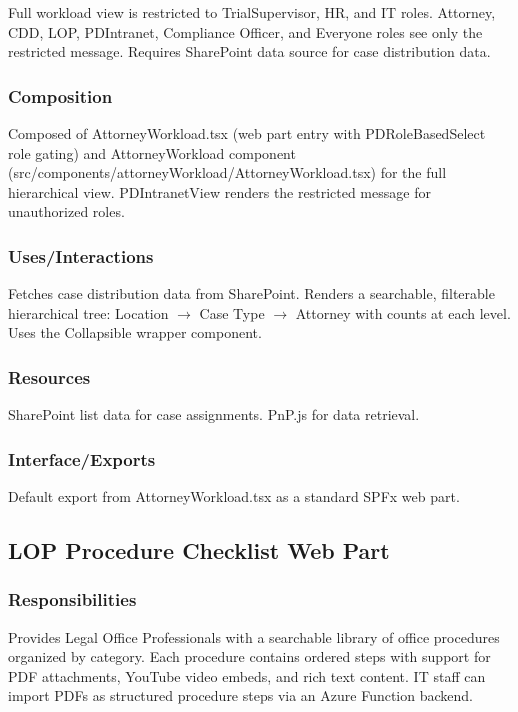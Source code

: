 \documentclass[12pt]{article}
\begin{document}
Full workload view is restricted to TrialSupervisor, HR, and IT roles. Attorney, CDD, LOP, PDIntranet, Compliance Officer, and Everyone roles see only the restricted message. Requires SharePoint data source for case distribution data.

\subsubsection{Composition}

Composed of AttorneyWorkload.tsx (web part entry with PDRoleBasedSelect role gating) and AttorneyWorkload component (src/components/attorneyWorkload/AttorneyWorkload.tsx) for the full hierarchical view. PDIntranetView renders the restricted message for unauthorized roles.

\subsubsection{Uses/Interactions}

Fetches case distribution data from SharePoint. Renders a searchable, filterable hierarchical tree: Location $\rightarrow$ Case Type $\rightarrow$ Attorney with counts at each level. Uses the Collapsible wrapper component.

\subsubsection{Resources}

SharePoint list data for case assignments. PnP.js for data retrieval.

\subsubsection{Interface/Exports}

Default export from AttorneyWorkload.tsx as a standard SPFx web part.

\subsection{LOP Procedure Checklist Web Part}

\subsubsection{Responsibilities}

Provides Legal Office Professionals with a searchable library of office procedures organized by category. Each procedure contains ordered steps with support for PDF attachments, YouTube video embeds, and rich text content. IT staff can import PDFs as structured procedure steps via an Azure Function backend.
\end{document}
